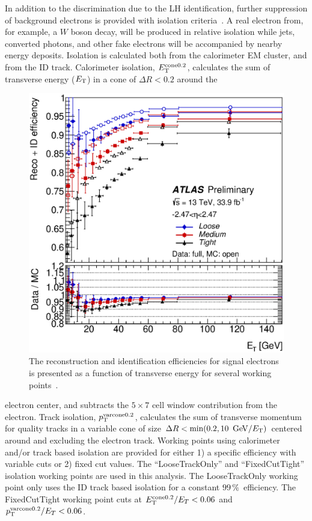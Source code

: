 In addition to the discrimination due to the LH identification, further suppression of background electrons is provided with isolation criteria~\cite{electron_efficiency_2016}. A real electron from, for example, a $W$ boson decay, will be produced in relative isolation while jets, converted photons, and other fake electrons will be accompanied by nearby energy deposits. Isolation is calculated both from the calorimeter EM cluster, and from the ID track. Calorimeter isolation, $E_{\rm T}^{\textrm{cone} 0.2}$, calculates the sum of transverse energy ($E_{\rm T}$) in a cone of $\Delta R<0.2$ around the 
\begin{figure}
\begin{center}
\includegraphics[width=.59\textwidth]{figures/ObjectReconstruction/el_id_eff}
\end{center}
\caption[Electron reconstruction and identification efficiencies]{The reconstruction and identification efficiencies for signal electrons is presented as a function of transverse energy for several working points~\cite{el_id_eff}.}
\label{fig:el_id_eff}
\end{figure}
electron center, and subtracts the $5\times7$ cell window contribution from the electron. Track isolation, $p_{\text{T}}^{\textrm{varcone} 0.2}$, calculates the sum of transverse momentum for quality tracks in a variable cone of size $\Delta R< \textrm{min}(0.2, 10\,\GeV/E_{\rm T})$ centered around and excluding the electron track. Working points using calorimeter and/or track based isolation are provided for either 1) a specific efficiency with variable cuts or 2) fixed cut values. The ``LooseTrackOnly'' and ``FixedCutTight'' isolation working points are used in this analysis. The LooseTrackOnly working point only uses the ID track based isolation for a constant $99\,\%$\, efficiency. The FixedCutTight working point cuts at $E_{\rm T}^{\textrm{cone} 0.2}/E_T < 0.06$ and $p_{\text{T}}^{\textrm{varcone} 0.2}/E_T < 0.06$.

